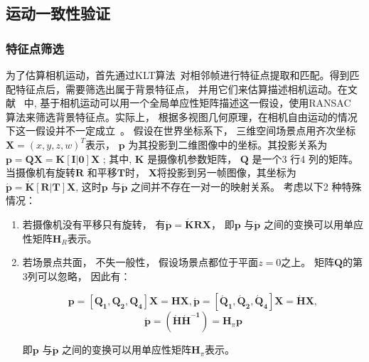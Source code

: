 \subsection{运动一致性验证}
\label{ch5:sec:sub:motionv}

\subsubsection{特征点筛选}
\label{ch5:sec:sub:sub:fp}
 为了估算相机运动，首先通过KLT算法~\cite{KLT}对相邻帧进行特征点提取和匹配。得到匹配特征点后，需要筛选出属于背景特征点， 并用它们来估算描述相机运动。在文献~ 中, 基于相机运动可以用一个全局单应性矩阵描述这一假设，使用RANSAC 算法来筛选背景特征点。实际上， 根据多视图几何原理，在相机自由运动的情况下这一假设并不一定成立~\cite{Multitransform}。 假设在世界坐标系下， 三维空间场景点用齐次坐标$\mathbf{X}={(x,y,z,w)}^T$表示， $\mathbf{p}$ 为其投影到二维图像中的坐标。其投影关系为$\mathbf{p} = \mathbf{QX} = \mathbf{K[I|0]X}$ ; 其中, $\mathbf{K}$ 是摄像机参数矩阵， $\mathbf{Q}$ 是一个3 行4 列的矩阵。 当摄像机有旋转$\mathbf{R}$ 和平移$\mathbf{T}$时， $\mathbf{X}$将投影到另一帧图像，其坐标为 $\mathbf{\acute{p}}=\mathbf{\acute{K}[R|T]X}$, 这时$\mathbf{p}$ 与$\mathbf{\acute{p}}$ 之间并不存在一对一的映射关系。 考虑以下2 种特殊情况：
 \begin{enumerate}
   \item 若摄像机没有平移只有旋转， 有$\mathbf{\acute{p}}=\mathbf{\acute{K}RX}$， 即$\mathbf{p}$ 与$\mathbf{\acute{p}}$ 之间的变换可以用单应性矩阵$\mathbf{H}_R$表示。
   \item 若场景点共面， 不失一般性， 假设场景点都位于平面$z=0$之上。 矩阵$\mathbf{Q}$的第3列可以忽略， 因此有：


    $$\mathbf{p}=[\mathbf{Q_1},\mathbf{Q_2},\mathbf{Q_4}]\mathbf{X} = \mathbf{HX},  \mathbf{\acute{p}}=[\mathbf{\acute{Q}_1},\mathbf{\acute{Q}_2},\mathbf{\acute{Q}_4}]\mathbf{X} = \mathbf{\acute{H}X},  $$
   $$ \mathbf{\acute{p}} = (\mathbf{\acute{H}\acute{H}^{-1}})=\mathbf{H}_{\pi} \mathbf{p} $$


  即$\mathbf{p}$ 与$\mathbf{\acute{p}}$ 之间的变换可以用单应性矩阵$\mathbf{H}_{\pi}$表示。
 \end{enumerate}


